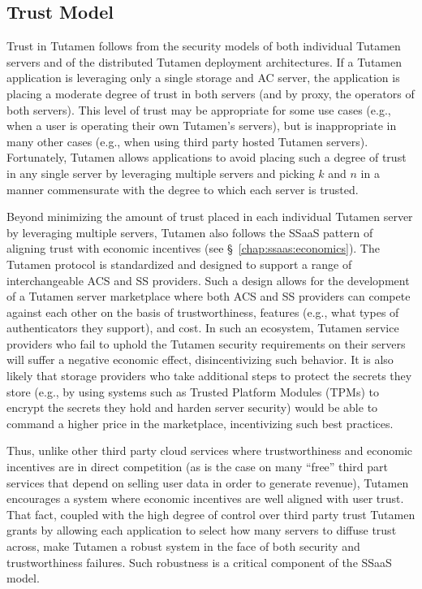 \subsection{Trust Model}

Trust in Tutamen follows from the security models of both individual
Tutamen servers and of the distributed Tutamen deployment
architectures. If a Tutamen application is leveraging only a single
storage and AC server, the application is placing a moderate degree of
trust in both servers (and by proxy, the operators of both
servers). This level of trust may be appropriate for some use cases
(e.g., when a user is operating their own Tutamen's servers), but is
inappropriate in many other cases (e.g., when using third party hosted
Tutamen servers). Fortunately, Tutamen allows applications to avoid
placing such a degree of trust in any single server by leveraging
multiple servers and picking $k$ and $n$ in a manner commensurate with
the degree to which each server is trusted.

Beyond minimizing the amount of trust placed in each individual
Tutamen server by leveraging multiple servers, Tutamen also follows
the SSaaS pattern of aligning trust with economic incentives (see
\S~\ref{chap:ssaas:economics}). The Tutamen protocol is standardized
and designed to support a range of interchangeable ACS and SS
providers. Such a design allows for the development of a Tutamen
server marketplace where both ACS and SS providers can compete against
each other on the basis of trustworthiness, features (e.g., what types
of authenticators they support), and cost. In such an ecosystem,
Tutamen service providers who fail to uphold the Tutamen security
requirements on their servers will suffer a negative economic effect,
disincentivizing such behavior. It is also likely that storage
providers who take additional steps to protect the secrets they store
(e.g., by using systems such as Trusted Platform Modules (TPMs) to
encrypt the secrets they hold and harden server security) would be
able to command a higher price in the marketplace, incentivizing such
best practices.

Thus, unlike other third party cloud services where trustworthiness
and economic incentives are in direct competition (as is the case on
many ``free'' third part services that depend on selling user data in
order to generate revenue), Tutamen encourages a system where economic
incentives are well aligned with user trust. That fact, coupled with
the high degree of control over third party trust Tutamen grants by
allowing each application to select how many servers to diffuse trust
across, make Tutamen a robust system in the face of both security and
trustworthiness failures. Such robustness is a critical component of
the SSaaS model.

